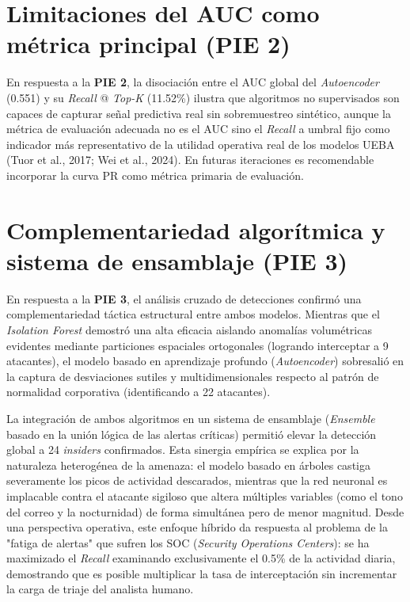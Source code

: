 \documentclass[IB]{TFUOC}%
\begin{document}
\section{Limitaciones del AUC como métrica principal (PIE 2)}

En respuesta a la \textbf{PIE 2}, la disociación entre el AUC global del \textit{Autoencoder} (0.551) y su \textit{Recall} @ \textit{Top-K} (11.52\%) ilustra que algoritmos no supervisados son capaces de capturar señal predictiva real sin sobremuestreo sintético, aunque la métrica de evaluación adecuada no es el AUC sino el \textit{Recall} a umbral fijo como indicador más representativo de la utilidad operativa real de los modelos UEBA (Tuor et al., 2017; Wei et al., 2024). En futuras iteraciones es recomendable incorporar la curva PR como métrica primaria de evaluación.

\section{Complementariedad algorítmica y sistema de ensamblaje (PIE 3)}

En respuesta a la \textbf{PIE 3}, el análisis cruzado de detecciones confirmó una complementariedad táctica estructural entre ambos modelos. Mientras que el \textit{Isolation Forest} demostró una alta eficacia aislando anomalías volumétricas evidentes mediante particiones espaciales ortogonales (logrando interceptar a 9 atacantes), el modelo basado en aprendizaje profundo (\textit{Autoencoder}) sobresalió en la captura de desviaciones sutiles y multidimensionales respecto al patrón de normalidad corporativa (identificando a 22 atacantes).

\medskip
\noindent La integración de ambos algoritmos en un sistema de ensamblaje (\textit{Ensemble} basado en la unión lógica de las alertas críticas) permitió elevar la detección global a 24 \textit{insiders} confirmados. Esta sinergia empírica se explica por la naturaleza heterogénea de la amenaza: el modelo basado en árboles castiga severamente los picos de actividad descarados, mientras que la red neuronal es implacable contra el atacante sigiloso que altera múltiples variables (como el tono del correo y la nocturnidad) de forma simultánea pero de menor magnitud. Desde una perspectiva operativa, este enfoque híbrido da respuesta al problema de la "fatiga de alertas" que sufren los SOC (\textit{Security Operations Centers}): se ha maximizado el \textit{Recall} examinando exclusivamente el 0.5\% de la actividad diaria, demostrando que es posible multiplicar la tasa de interceptación sin incrementar la carga de triaje del analista humano.
\end{document}
